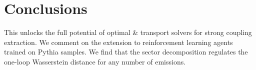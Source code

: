 \section{Conclusions}\label{sec:conclusions}

This unlocks the full potential of optimal & transport solvers for strong
coupling extraction. We comment on the extension to reinforcement
learning agents trained on Pythia samples. We find that the sector
decomposition regulates the one-loop Wasserstein distance for any number
of emissions.

